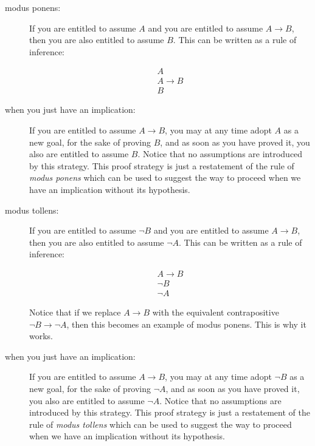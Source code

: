 \documentclass[12pt]{article}
\begin{document}
\begin{description}

\item[modus ponens:]  If you are entitled to assume $A$ and you are entitled to assume $A \rightarrow B$, then 
you are also entitled to assume $B$.  This can be written as a rule of inference:

$$\begin{array}{l} A \\A \rightarrow  B \\ \hline B \end{array}$$

\item[when you just have an implication:]  If you are entitled to assume $A \rightarrow B$, you may at any time adopt $A$ as a new goal, for the sake of proving $B$, and as soon as you have proved it, you also are entitled to assume $B$.  Notice that no assumptions are introduced by this strategy.  This proof strategy is just a restatement of the rule of {\em modus ponens\/} which can be used to suggest the way to proceed when we have an implication without its hypothesis.

\item[modus tollens:]  If you are entitled to assume $\neg B$ and you are entitled to assume $A \rightarrow B$, then 
you are also entitled to assume $\neg A$.  This can be written as a rule of inference:

$$\begin{array}{l} A \rightarrow  B \\ \neg B \\ \hline \neg A \end{array}$$

Notice that if we replace $A \rightarrow B$ with the equivalent contrapositive $\neg B \rightarrow \neg A$, then this becomes an example of modus ponens.  This is why it works.

\item[when you just have an implication:]  If you are entitled to assume $A \rightarrow B$, you may at any time adopt $\neg B$ as a new goal, for the sake of proving $\neg A$, and as soon as you have proved it, you also are entitled to assume $\neg A$.  Notice that no assumptions are introduced by this strategy.  This proof strategy is just a restatement of the rule of {\em modus tollens\/} which can be used to suggest the way to proceed when we have an implication without its hypothesis.

\end{description}
\end{document}
